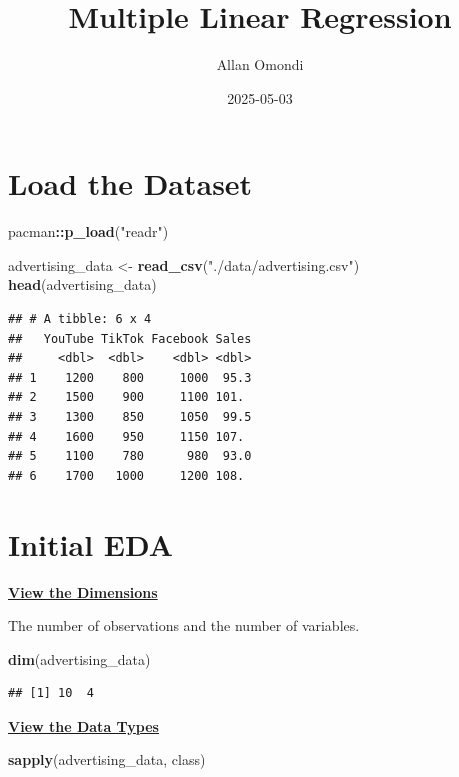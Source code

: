 \documentclass[
]{article}
\title{Multiple Linear Regression}
\author{Allan Omondi}
\date{2025-05-03}
\newenvironment{Shaded}{\begin{snugshade}}{\end{snugshade}}
\newcommand{\FunctionTok}[1]{\textcolor[rgb]{0.13,0.29,0.53}{\textbf{#1}}}
\newcommand{\NormalTok}[1]{#1}
\newcommand{\OtherTok}[1]{\textcolor[rgb]{0.56,0.35,0.01}{#1}}
\newcommand{\SpecialCharTok}[1]{\textcolor[rgb]{0.81,0.36,0.00}{\textbf{#1}}}
\newcommand{\StringTok}[1]{\textcolor[rgb]{0.31,0.60,0.02}{#1}}
\begin{document}
\maketitle

{
\setcounter{tocdepth}{4}
\tableofcontents
}
\section{Load the Dataset}\label{load-the-dataset}

\begin{Shaded}
\begin{Highlighting}[]
\NormalTok{pacman}\SpecialCharTok{::}\FunctionTok{p\_load}\NormalTok{(}\StringTok{"readr"}\NormalTok{)}

\NormalTok{advertising\_data }\OtherTok{\textless{}{-}} \FunctionTok{read\_csv}\NormalTok{(}\StringTok{"./data/advertising.csv"}\NormalTok{)}
\FunctionTok{head}\NormalTok{(advertising\_data)}
\end{Highlighting}
\end{Shaded}

\begin{verbatim}
## # A tibble: 6 x 4
##   YouTube TikTok Facebook Sales
##     <dbl>  <dbl>    <dbl> <dbl>
## 1    1200    800     1000  95.3
## 2    1500    900     1100 101. 
## 3    1300    850     1050  99.5
## 4    1600    950     1150 107. 
## 5    1100    780      980  93.0
## 6    1700   1000     1200 108.
\end{verbatim}

\section{Initial EDA}\label{initial-eda}

\ul{\textbf{View the Dimensions}}

The number of observations and the number of variables.

\begin{Shaded}
\begin{Highlighting}[]
\FunctionTok{dim}\NormalTok{(advertising\_data)}
\end{Highlighting}
\end{Shaded}

\begin{verbatim}
## [1] 10  4
\end{verbatim}

\ul{\textbf{View the Data Types}}

\begin{Shaded}
\begin{Highlighting}[]
\FunctionTok{sapply}\NormalTok{(advertising\_data, class)}
\end{Highlighting}
\end{Shaded}
\end{document}
